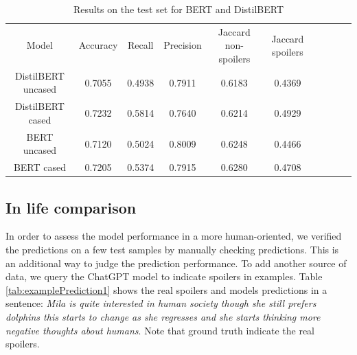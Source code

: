 \documentclass[11pt]{article}
\begin{document}
\begin{table}[t]
    \centering
\begin{tabular}{llllllllll}
\cline{1-6}
\multicolumn{1}{|c|}{Model}              & \multicolumn{1}{c|}{Accuracy} & \multicolumn{1}{c|}{Recall} & \multicolumn{1}{c|}{Precision} & \multicolumn{1}{c|}{Jaccard non-spoilers} & \multicolumn{1}{c|}{Jaccard spoilers} &  &  &  &  \\ \cline{1-6}
\multicolumn{1}{|c|}{DistilBERT uncased} & \multicolumn{1}{c|}{0.7055}   & \multicolumn{1}{c|}{0.4938} & \multicolumn{1}{c|}{0.7911}    & \multicolumn{1}{c|}{0.6183}               & \multicolumn{1}{c|}{0.4369}           &  &  &  &  \\ \cline{1-6}
\multicolumn{1}{|c|}{DistilBERT cased}    & \multicolumn{1}{c|}{0.7232}   & \multicolumn{1}{c|}{0.5814} & \multicolumn{1}{c|}{0.7640}    & \multicolumn{1}{c|}{0.6214}               & \multicolumn{1}{c|}{0.4929}           &  &  &  &  \\ \cline{1-6}
\multicolumn{1}{|c|}{BERT uncased}       & \multicolumn{1}{c|}{0.7120}   & \multicolumn{1}{c|}{0.5024} & \multicolumn{1}{c|}{0.8009}    & \multicolumn{1}{c|}{0.6248}               & \multicolumn{1}{c|}{0.4466}           &  &  &  &  \\ \cline{1-6}
\multicolumn{1}{|c|}{BERT cased}         & \multicolumn{1}{c|}{0.7205}   & \multicolumn{1}{c|}{0.5374} & \multicolumn{1}{c|}{0.7915}    & \multicolumn{1}{c|}{0.6280}               & \multicolumn{1}{c|}{0.4708}           &  &  &  &  \\ \cline{1-6} 
\end{tabular}
    \caption{Results on the test set for BERT and DistilBERT}
    \label{tab:resultsBertDistilBert}
\end{table}





\subsection{In life comparison}

In order to assess the model performance in a more human-oriented, we verified the predictions on a few test samples by manually checking predictions. This is an additional way to judge the prediction performance. To add another source of data, we query the ChatGPT model to indicate spoilers in examples. Table \ref{tab:examplePrediction1} shows the real spoilers and models predictions in a sentence: \emph{Mila is quite interested in human society though she still prefers dolphins this starts to change as she regresses and she starts thinking more negative thoughts about humans}. Note that ground truth indicate the real spoilers. 
\end{document}
